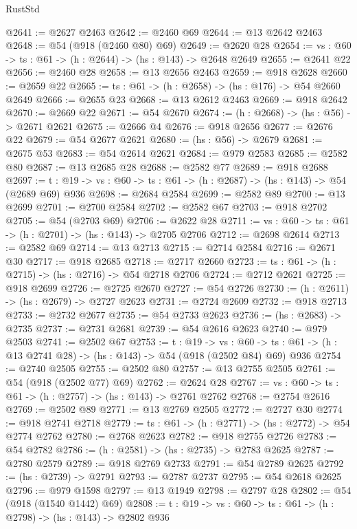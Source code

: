 \begin{lexlean}{RustStd}
\begin{coremodule}
@2641 := @2627 @2463
@2642 := @2460 @69
@2644 := @13 @2642 @2463
@2648 := @54 (@918 (@2460 @80) @69)
@2649 := @2620 @28
@2654 := {vs : @60} -> {ts : @61} -> (h : @2644) -> (hs : @143) -> @2648 @2649
@2655 := @2641 @22
@2656 := @2460 @28
@2658 := @13 @2656 @2463
@2659 := @918 @2628
@2660 := @2659 @22
@2665 := {ts : @61} -> (h : @2658) -> (hs : @176) -> @54 @2660 @2649
@2666 := @2655 @23
@2668 := @13 @2612 @2463
@2669 := @918 @2642
@2670 := @2669 @22
@2671 := @54 @2670
@2674 := (h : @2668) -> (hs : @56) -> @2671 @2621
@2675 := @2666 @4
@2676 := @918 @2656
@2677 := @2676 @22
@2679 := @54 @2677 @2621
@2680 := (hs : @56) -> @2679
@2681 := @2675 @53
@2683 := @54 @2614 @2621
@2684 := @979 @2583
@2685 := @2582 @80
@2687 := @13 @2685 @28
@2688 := @2582 @77
@2689 := @918 @2688
@2697 := {t : @19} -> {vs : @60} -> {ts : @61} -> (h : @2687) -> (hs : @143) -> @54 (@2689 @69) @936
@2698 := @2684 @2584
@2699 := @2582 @89
@2700 := @13 @2699
@2701 := @2700 @2584
@2702 := @2582 @67
@2703 := @918 @2702
@2705 := @54 (@2703 @69)
@2706 := @2622 @28
@2711 := {vs : @60} -> {ts : @61} -> (h : @2701) -> (hs : @143) -> @2705 @2706
@2712 := @2698 @2614
@2713 := @2582 @69
@2714 := @13 @2713
@2715 := @2714 @2584
@2716 := @2671 @30
@2717 := @918 @2685
@2718 := @2717 @2660
@2723 := {ts : @61} -> (h : @2715) -> (hs : @2716) -> @54 @2718 @2706
@2724 := @2712 @2621
@2725 := @918 @2699
@2726 := @2725 @2670
@2727 := @54 @2726
@2730 := (h : @2611) -> (hs : @2679) -> @2727 @2623
@2731 := @2724 @2609
@2732 := @918 @2713
@2733 := @2732 @2677
@2735 := @54 @2733 @2623
@2736 := (hs : @2683) -> @2735
@2737 := @2731 @2681
@2739 := @54 @2616 @2623
@2740 := @979 @2503
@2741 := @2502 @67
@2753 := {t : @19} ->
  {vs : @60} -> {ts : @61} -> (h : @13 @2741 @28) -> (hs : @143) -> @54 (@918 (@2502 @84) @69) @936
@2754 := @2740 @2505
@2755 := @2502 @80
@2757 := @13 @2755 @2505
@2761 := @54 (@918 (@2502 @77) @69)
@2762 := @2624 @28
@2767 := {vs : @60} -> {ts : @61} -> (h : @2757) -> (hs : @143) -> @2761 @2762
@2768 := @2754 @2616
@2769 := @2502 @89
@2771 := @13 @2769 @2505
@2772 := @2727 @30
@2774 := @918 @2741 @2718
@2779 := {ts : @61} -> (h : @2771) -> (hs : @2772) -> @54 @2774 @2762
@2780 := @2768 @2623
@2782 := @918 @2755 @2726
@2783 := @54 @2782
@2786 := (h : @2581) -> (hs : @2735) -> @2783 @2625
@2787 := @2780 @2579
@2789 := @918 @2769 @2733
@2791 := @54 @2789 @2625
@2792 := (hs : @2739) -> @2791
@2793 := @2787 @2737
@2795 := @54 @2618 @2625
@2796 := @979 @1598
@2797 := @13 @1949
@2798 := @2797 @28
@2802 := @54 (@918 (@1540 @1442) @69)
@2808 := {t : @19} -> {vs : @60} -> {ts : @61} -> (h : @2798) -> (hs : @143) -> @2802 @936

\end{coremodule}
\end{lexlean}
